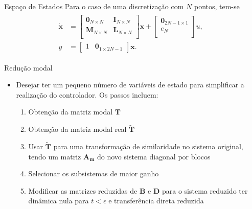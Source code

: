 \documentclass[10pt]{beamer}
\begin{document}
\begin{frame}[fragile]{Espaço de Estados}
Para o caso de uma discretização com $N$ pontos, tem-se 
\begin{align}
\begin{array}{ll}
 	\dot{\mathbf{x}} &= \left[\begin{array}{cc}
	\mathbf{0}_{N\times N} & \mathbf{I}_{N\times N}\\
	\mathbf{M}_{N\times N} & \mathbf{L}_{N\times N}\\
\end{array}\right] \mathbf{x} + \left[\begin{array}{c}
	\mathbf{0}_{2N-1\times 1}\\ e_N\\
\end{array} \right]u,\;\;\\
y &= \left[\begin{array}{cc}
	1 & \textbf{0}_{1\times 2N-1}
\end{array}\right]\textbf{x}.
\end{array}
 \end{align}

\end{frame}

\begin{frame}[fragile]{Redução modal}
\begin{block}{}
\begin{itemize}
	\item Desejar ter um pequeno número de variáveis de estado para simplificar a realização do controlador. Os passos incluem:
		\begin{enumerate}
			\item Obtenção da matriz modal $\mathbf{T}$ \label{obtencaoT}
			\item Obtenção da matriz modal real $\tilde{\mathbf{T}}$ \label{obtencaoTReal}
			\item Usar $\tilde{\mathbf{T}}$ para uma transformação de similaridade no sistema original, tendo um matriz $\mathbf{A_m}$ do novo sistema diagonal por blocos \label{similaridadeTransformacao}
			\item Selecionar os subsistemas de maior ganho
			\item Modificar as matrizes reduzidas de $\mathbf{B}$ e $\mathbf{D}$ para o sistema reduzido ter dinâmica nula para $t < \epsilon$ e transferência direta reduzida
		\end{enumerate}
\end{itemize}	
\end{block}

\end{frame}
\end{document}
